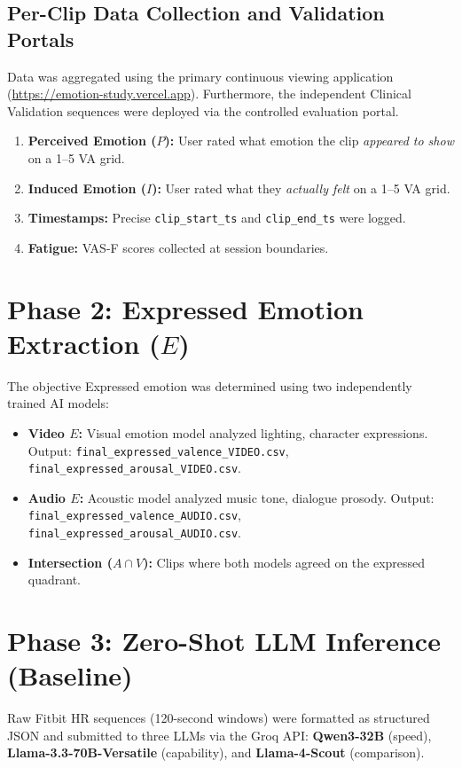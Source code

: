 \documentclass[11pt, a4paper]{report}
\begin{document}
\subsection{Per-Clip Data Collection and Validation Portals}
Data was aggregated using the primary continuous viewing application (\url{https://emotion-study.vercel.app}). Furthermore, the independent Clinical Validation sequences were deployed via the controlled evaluation portal.

\begin{enumerate}
    \item \textbf{Perceived Emotion ($P$):} User rated what emotion the clip \textit{appeared to show} on a 1--5 VA grid.
    \item \textbf{Induced Emotion ($I$):} User rated what they \textit{actually felt} on a 1--5 VA grid.
    \item \textbf{Timestamps:} Precise \texttt{clip\_start\_ts} and \texttt{clip\_end\_ts} were logged.
    \item \textbf{Fatigue:} VAS-F scores collected at session boundaries.
\end{enumerate}

\section{Phase 2: Expressed Emotion Extraction ($E$)}
The objective Expressed emotion was determined using two independently trained AI models:
\begin{itemize}
    \item \textbf{Video $E$:} Visual emotion model analyzed lighting, character expressions. Output: \texttt{final\_expressed\_valence\_VIDEO.csv}, \texttt{final\_expressed\_arousal\_VIDEO.csv}.
    \item \textbf{Audio $E$:} Acoustic model analyzed music tone, dialogue prosody. Output: \texttt{final\_expressed\_valence\_AUDIO.csv}, \texttt{final\_expressed\_arousal\_AUDIO.csv}.
    \item \textbf{Intersection ($A \cap V$):} Clips where both models agreed on the expressed quadrant.
\end{itemize}

\section{Phase 3: Zero-Shot LLM Inference (Baseline)}
Raw Fitbit HR sequences (120-second windows) were formatted as structured JSON and submitted to three LLMs via the Groq API: \textbf{Qwen3-32B} (speed), \textbf{Llama-3.3-70B-Versatile} (capability), and \textbf{Llama-4-Scout} (comparison).
\end{document}
